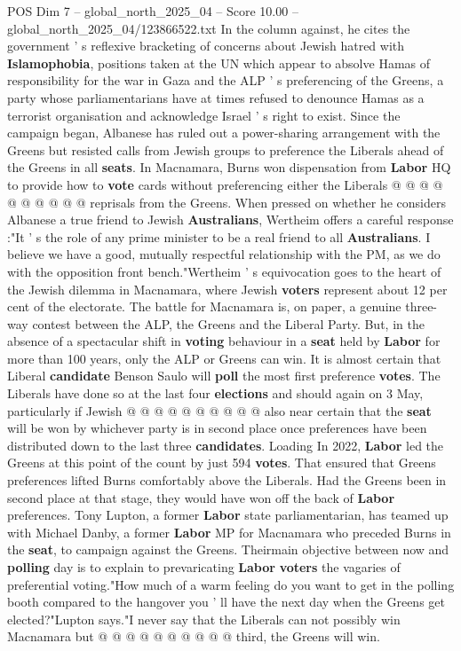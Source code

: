 \begin{textsample}{POS Dim 7 – global\_north\_2025\_04 – Score 10.00 – global\_north\_2025\_04/123866522.txt}
In the column against, he cites the government ' s reflexive bracketing of concerns about Jewish hatred with \textbf{Islamophobia}, positions taken at the UN which appear to absolve Hamas of responsibility for the war in Gaza and the ALP ' s preferencing of the Greens, a party whose parliamentarians have at times refused to denounce Hamas as a terrorist organisation and acknowledge Israel ' s right to exist.
Since the campaign began, Albanese has ruled out a power-sharing arrangement with the Greens but resisted calls from Jewish groups to preference the Liberals ahead of the Greens in all \textbf{seats}.
In Macnamara, Burns won dispensation from \textbf{Labor} HQ to provide how to \textbf{vote} cards without preferencing either the Liberals @ @ @ @ @ @ @ @ @ @ reprisals from the Greens.
When pressed on whether he considers Albanese a true friend to Jewish \textbf{Australians}, Wertheim offers a careful response :"It ' s the role of any prime minister to be a real friend to all \textbf{Australians}.
I believe we have a good, mutually respectful relationship with the PM, as we do with the opposition front bench."Wertheim ' s equivocation goes to the heart of the Jewish dilemma in Macnamara, where Jewish \textbf{voters} represent about 12 per cent of the electorate.
The battle for Macnamara is, on paper, a genuine three-way contest between the ALP, the Greens and the Liberal Party.
But, in the absence of a spectacular shift in \textbf{voting} behaviour in a \textbf{seat} held by \textbf{Labor} for more than 100 years, only the ALP or Greens can win.
It is almost certain that Liberal \textbf{candidate} Benson Saulo will \textbf{poll} the most first preference \textbf{votes}.
The Liberals have done so at the last four \textbf{elections} and should again on 3 May, particularly if Jewish @ @ @ @ @ @ @ @ @ @ also near certain that the \textbf{seat} will be won by whichever party is in second place once preferences have been distributed down to the last three \textbf{candidates}.
Loading In 2022, \textbf{Labor} led the Greens at this point of the count by just 594 \textbf{votes}.
That ensured that Greens preferences lifted Burns comfortably above the Liberals.
Had the Greens been in second place at that stage, they would have won off the back of \textbf{Labor} preferences.
Tony Lupton, a former \textbf{Labor} state parliamentarian, has teamed up with Michael Danby, a former \textbf{Labor} MP for Macnamara who preceded Burns in the \textbf{seat}, to campaign against the Greens.
Theirmain objective between now and \textbf{polling} day is to explain to prevaricating \textbf{Labor} \textbf{voters} the vagaries of preferential voting."How much of a warm feeling do you want to get in the polling booth compared to the hangover you ' ll have the next day when the Greens get elected?"Lupton says."I never say that the Liberals can not possibly win Macnamara but @ @ @ @ @ @ @ @ @ @ third, the Greens will win.

\end{textsample}

